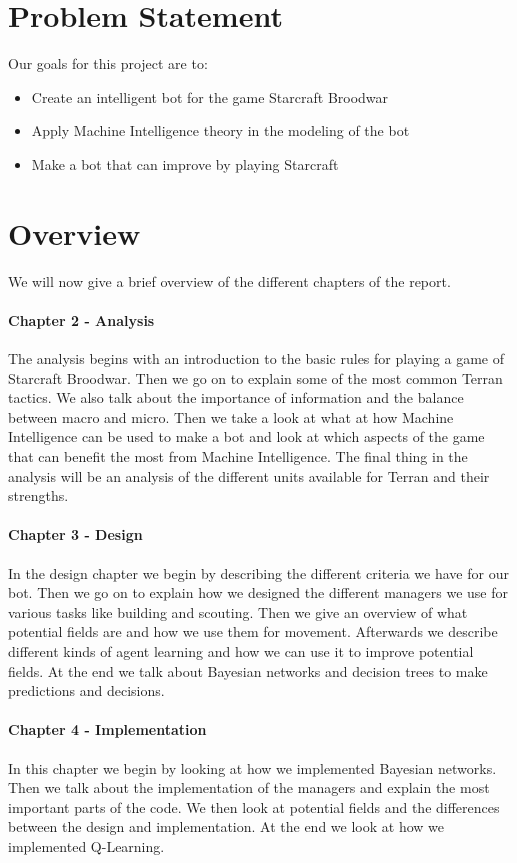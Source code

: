 \section{Problem Statement}
	Our goals for this project are to:
	\begin{itemize}
		\item Create an intelligent bot for the game Starcraft Broodwar
		\item Apply Machine Intelligence theory in the modeling of the bot
		\item Make a bot that can improve by playing Starcraft
	\end{itemize}

\section{Overview}
	We will now give a brief overview of the different chapters of the report.

\paragraph*{Chapter 2 - Analysis}
The analysis begins with an introduction to the basic rules for playing a game of Starcraft Broodwar. Then we go on to explain some of the most common Terran tactics. We also talk about the importance of information and the balance between macro and micro. Then we take a look at what at how Machine Intelligence can be used to make a bot and look at which aspects of the game that can benefit the most from Machine Intelligence. The final thing in the analysis will be an analysis of the different units available for Terran and their strengths.

\paragraph*{Chapter 3 - Design}
In the design chapter we begin by describing the different criteria we have for our bot. Then we go on to explain how we designed the different managers we use for various tasks like building and scouting. Then we give an overview of what potential fields are and how we use them for movement. Afterwards we describe different kinds of agent learning and how we can use it to improve potential fields. At the end we talk about Bayesian networks and decision trees to make predictions and decisions.

\paragraph*{Chapter 4 - Implementation}
In this chapter we begin by looking at how we implemented Bayesian networks. Then we talk about the implementation of the managers and explain the most important parts of the code. We then look at potential fields and the differences between the design and implementation. At the end we look at how we implemented Q-Learning.

